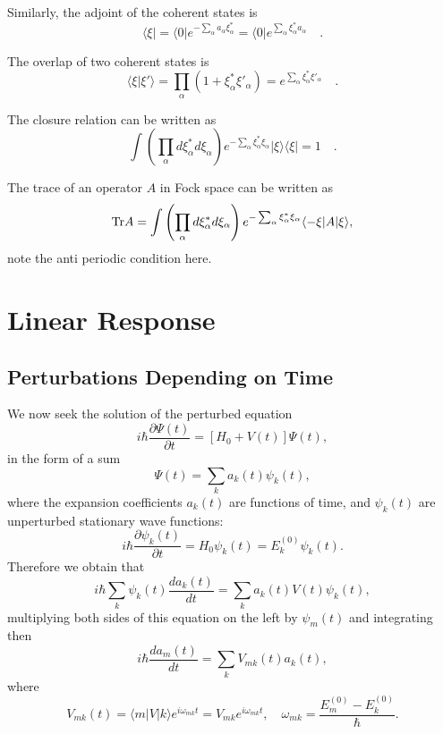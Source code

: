 \documentclass{book}
\newcommand{\bra}[1]{{\langle#1|}}
\newcommand{\ket}[1]{{|#1\rangle}}
\newcommand{\inprod}[2]{\langle#1|#2\rangle}
\numberwithin{equation}{section}
\begin{document}
Similarly, the adjoint of the coherent states is
\begin{equation}
  \bra{\xi}=\bra{0}e^{-\sum_\alpha a_\alpha\xi_\alpha^*}
  =\bra{0}e^{\sum_\alpha\xi_\alpha^*a_\alpha}\quad.
\end{equation}

The overlap of two coherent states is 
\begin{equation}
  \inprod{\xi}{\xi'}=\prod_\alpha(1+\xi_\alpha^*\xi'_\alpha)
  =e^{\sum_\alpha\xi_\alpha^*\xi'_\alpha}\quad.
\end{equation}

The closure relation can be written as
\begin{equation}
  \int\left(\prod_\alpha d\xi_\alpha^*d\xi_\alpha\right)
  e^{-\sum_\alpha\xi_\alpha^*\xi_\alpha}\ket{\xi}\bra{\xi}=1\quad.
\end{equation}

The trace of an operator $A$ in Fock space can be written as
\begin{equation}
  {\rm Tr}A=\int\left(\prod_\alpha d\xi_\alpha^*d\xi_\alpha\right)
  e^{-\sum_\alpha\xi_\alpha^*\xi_\alpha}\bra{-\xi}A\ket{\xi},
\end{equation}
note the anti periodic condition here.


\chapter{Linear Response}
\section{Perturbations Depending on Time}
We now seek the solution of the perturbed equation
\begin{equation}
  i\hbar\frac{\partial\Psi(t)}{\partial t}=[H_0+V(t)]\Psi(t),
\end{equation}
in the form of a sum
\begin{equation}
  \Psi(t)=\sum_ka_k(t)\psi_k(t),
\end{equation}
where the expansion coefficients $a_k(t)$ are functions of time,
and $\psi_k(t)$ are unperturbed stationary wave functions:
\begin{equation}
  i\hbar\frac{\partial\psi_k(t)}{\partial t}=H_0\psi_k(t)=E_k^{(0)}\psi_k(t).
\end{equation}
Therefore we obtain that
\begin{equation}
  i\hbar\sum_k\psi_k(t)\frac{da_k(t)}{dt}=\sum_ka_k(t)V(t)\psi_k(t),
\end{equation}
multiplying both sides of this equation on the left by $\psi_m(t)$ and
integrating then
\begin{equation}
  i\hbar\frac{da_m(t)}{dt}=\sum_kV_{mk}(t)a_k(t),
\end{equation}
where
\begin{equation}
  V_{mk}(t)=\bra{m}V\ket{k}e^{i\omega_{mk}t}=V_{mk}e^{i\omega_{mk}t},\quad
  \omega_{mk}=\frac{E_{m}^{(0)}-E_k^{(0)}}{\hbar}.
\end{equation}
\end{document}
